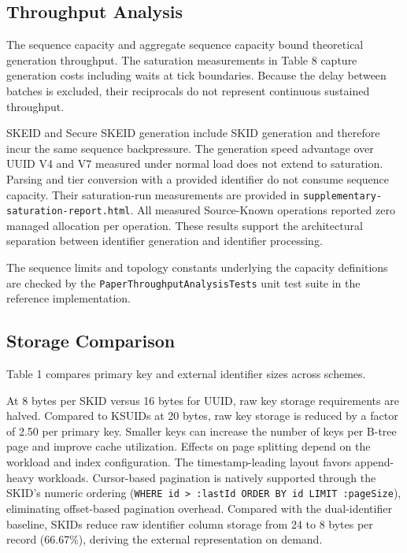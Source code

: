 \documentclass[fleqn,10pt,lineno]{wlpeerj}
\begin{document}
\subsection{Throughput Analysis}\label{throughput-analysis}

The sequence capacity and aggregate sequence capacity bound theoretical
generation throughput. The saturation measurements in Table 8 capture
generation costs including waits at tick boundaries. Because the delay
between batches is excluded, their reciprocals do not represent
continuous sustained throughput.

SKEID and Secure SKEID generation include SKID generation and therefore
incur the same sequence backpressure. The generation speed advantage
over UUID V4 and V7 measured under normal load does not extend to
saturation. Parsing and tier conversion with a provided identifier do
not consume sequence capacity. Their saturation-run measurements are
provided in \texttt{supplementary-saturation-report.html}. All measured
Source-Known operations reported zero managed allocation per operation.
These results support the architectural separation between identifier
generation and identifier processing.

The sequence limits and topology constants underlying the capacity
definitions are checked by the \texttt{PaperThroughputAnalysisTests}
unit test suite in the reference implementation.

\subsection{Storage Comparison}\label{storage-comparison}

Table 1 compares primary key and external identifier sizes across
schemes.

At 8 bytes per SKID versus 16 bytes for UUID, raw key storage
requirements are halved. Compared to KSUIDs at 20 bytes, raw key storage
is reduced by a factor of 2.50 per primary key. Smaller keys can
increase the number of keys per B-tree page and improve cache
utilization. Effects on page splitting depend on the workload and index
configuration. The timestamp-leading layout favors append-heavy
workloads. Cursor-based pagination is natively supported through the
SKID's numeric ordering
(\texttt{WHERE\ id\ \textgreater{}\ :lastId\ ORDER\ BY\ id\ LIMIT\ :pageSize}),
eliminating offset-based pagination overhead. Compared with the
dual-identifier baseline, SKIDs reduce raw identifier column storage
from 24 to 8 bytes per record (66.67\%), deriving the external
representation on demand.
\end{document}
